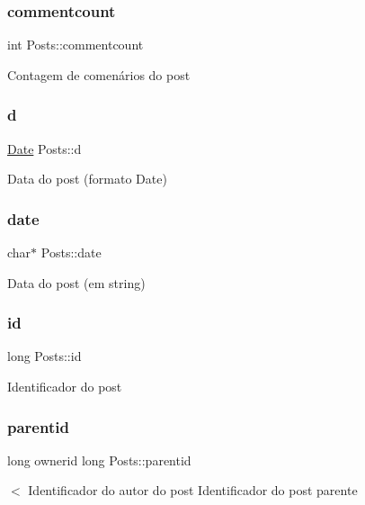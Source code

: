 \subsubsection{\texorpdfstring{commentcount}{commentcount}}
{\footnotesize\ttfamily int Posts\+::commentcount}

Contagem de comenários do post \mbox{\label{structPosts_aefbb21d741b93e29ab7472ee7eead3e3}} 
\subsubsection{\texorpdfstring{d}{d}}
{\footnotesize\ttfamily \hyperlink{structdates}{Date} Posts\+::d}

Data do post (formato Date) \mbox{\label{structPosts_a6cf5527c41212066350cf9da9986ea88}} 
\subsubsection{\texorpdfstring{date}{date}}
{\footnotesize\ttfamily char$\ast$ Posts\+::date}

Data do post (em string) \mbox{\label{structPosts_a41fa23f741404a41f9bd985a435ced89}} 
\subsubsection{\texorpdfstring{id}{id}}
{\footnotesize\ttfamily long Posts\+::id}

Identificador do post \mbox{\label{structPosts_aeb658e93ff47e9251e216aa070985980}} 
\subsubsection{\texorpdfstring{parentid}{parentid}}
{\footnotesize\ttfamily long ownerid long Posts\+::parentid}

$<$ Identificador do autor do post Identificador do post parente \mbox{\label{structPosts_a11d27a2452a5d95ee2260707efb76e78}} 
